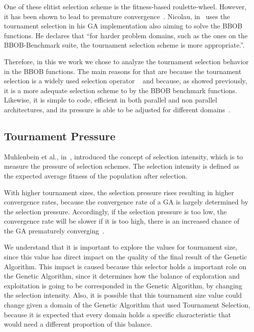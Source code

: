One of these elitist selection scheme is the fitness-based roulette-wheel. However, it has been shown to lead to premature convergence~\cite{baker1987reducing}. Nicolau, in~\cite{nicolau2009application} uses the tournament selection in his GA implementation also aiming to solve the BBOB functions. He declares that ``for harder problem domains, such as the ones on the BBOB-Benchmark suite, the tournament selection scheme is more appropriate.''.

Therefore, in this we work we chose to analyze the tournament selection behavior in the BBOB functions. The main reasons for that are because the tournament selection is a widely used selection operator ~\cite{goldberg1991real, goldberg1993toward, agrawal1995simulated, harik1999gambler, tsutsui1999multi, harik1999compact, deb2000efficient, beyer2001self,kaelo2007integrated, bhunia2009application,  nicolau2009application, sawyerr2011comparative, ecta14, sawyerr2015benchmarking} and because, as showed previously, it is a more adequate selection scheme to by the BBOB benchmark functions. Likewise, it is simple to code, efficient in both parallel and non parallel architectures, and its pressure is able to be adjusted for different domains~\cite{miller1995genetic}.



\subsection{Tournament Pressure}\label{sec:background:tournament_pressure} 
Muhlenbein et al., in~\cite{muhlenbein1993predictive}, introduced the concept of selection intensity, which is to measure the pressure of selection schemes. The selection intensity is defined as the expected average fitness of the population after selection.  

With higher tournament sizes, the selection pressure rises resulting in higher convergence rates, because the convergence rate of a GA is largely determined by the selection pressure.  Accordingly, if the selection pressure is too low, the convergence rate will be slower if it is too high, there is an increased chance of the GA prematurely converging~\cite{miller1995genetic}. 

We understand that it is important to explore the values for tournament size, since this value has direct impact  on the quality of the final result of the Genetic Algorithm. This impact is caused because this selector holds a important role on the Genetic Algorithm, since it determines how the balance of exploration and exploitation is going to be corresponded in the Genetic Algorithm, by changing the selection intensity. Also, it is possible that this tournament size value could change given a domain of the Genetic Algorithm that used Tournament Selection, because it is expected that every domain holds a specific characteristic that would need a different proportion of this balance.

